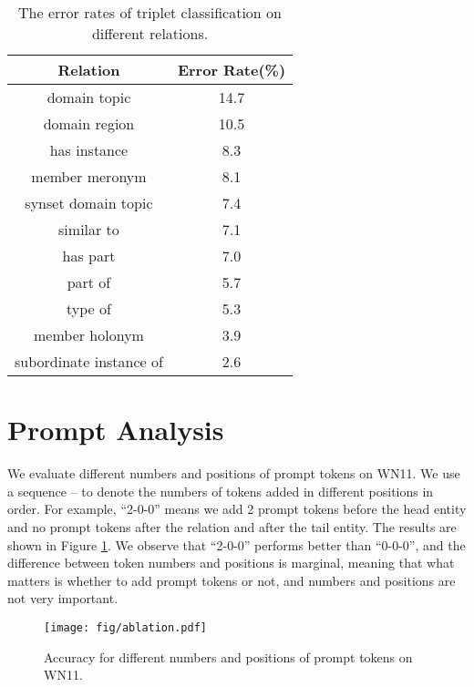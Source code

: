 \documentclass[11pt]{article}
\begin{document}
\begin{table}[htbp]
    \centering
    \begin{tabular}{c|c}
     \toprule
    Relation & Error Rate(\%) \\
    \hline
    domain topic & 14.7 \\
    domain region & 10.5 \\
    has instance & 8.3 \\
    member meronym & 8.1 \\
    synset domain topic & 7.4 \\
    similar to & 7.1 \\
    has part & 7.0 \\
    part of & 5.7 \\
    type of & 5.3 \\
    member holonym & 3.9 \\
    subordinate instance of & 2.6 \\
    \bottomrule
    \end{tabular}
    \caption{{\small The error rates of triplet classification on different relations.}}
    \label{tab:error}
\end{table}

\section{Prompt Analysis}
We evaluate different numbers and positions of prompt tokens on WN11. We use a sequence -- to denote the numbers of tokens added in different positions in order. For example, ``2-0-0'' means we add 2 prompt tokens before the head entity and no prompt tokens after the relation and after the tail entity. The results are shown in Figure \ref{fig:ablation}. We observe that ``2-0-0'' performs 
better than ``0-0-0'', and the difference between token numbers and positions is marginal, meaning that what matters is whether to add prompt tokens or not, and numbers and positions are not very important.



\begin{figure}[ht]
    \centering
    \texttt{[image: fig/ablation.pdf]}
    \caption{{\small Accuracy for different numbers and positions of prompt tokens on WN11.}}
    \label{fig:ablation}
\end{figure}
\end{document}
